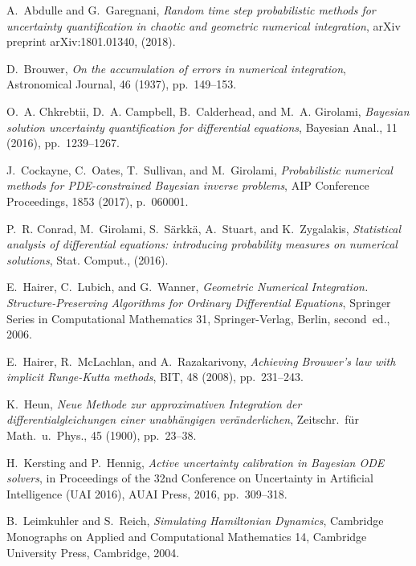 \documentclass{siamart1116}
\numberwithin{theorem}{section}
\begin{document}
\def\cprime{$'$}
\begin{thebibliography}{10}
	
	{\sc A.~Abdulle and G.~Garegnani}, {\em Random time step probabilistic methods
		for uncertainty quantification in chaotic and geometric numerical
		integration}, arXiv preprint arXiv:1801.01340,  (2018).
	
	{\sc D.~Brouwer}, {\em On the accumulation of errors in numerical integration},
	Astronomical Journal, 46 (1937), pp.~149--153.
	
	{\sc O.~A. Chkrebtii, D.~A. Campbell, B.~Calderhead, and M.~A. Girolami}, {\em
		Bayesian solution uncertainty quantification for differential equations},
	Bayesian Anal., 11 (2016), pp.~1239--1267.
	
	{\sc J.~Cockayne, C.~Oates, T.~Sullivan, and M.~Girolami}, {\em Probabilistic
		numerical methods for {PDE}-constrained {B}ayesian inverse problems}, AIP
	Conference Proceedings, 1853 (2017), p.~060001.
	
	{\sc P.~R. Conrad, M.~Girolami, S.~S{\"a}rkk{\"a}, A.~Stuart, and
		K.~Zygalakis}, {\em Statistical analysis of differential equations:
		introducing probability measures on numerical solutions}, Stat. Comput.,
	(2016).
	
	{\sc E.~Hairer, C.~Lubich, and G.~Wanner}, {\em Geometric Numerical
		Integration. Structure-Preserving Algorithms for Ordinary Differential
		Equations}, Springer Series in Computational Mathematics 31, Springer-Verlag,
	Berlin, second~ed., 2006.
	
	{\sc E.~Hairer, R.~McLachlan, and A.~Razakarivony}, {\em Achieving {B}rouwer's
		law with implicit {R}unge-{K}utta methods}, BIT, 48 (2008), pp.~231--243.
	
	{\sc K.~Heun}, {\em Neue {M}ethode zur approximativen {I}ntegration der
		dif\-feren\-tial\-gleichungen einer unabh\"angigen ver\"anderlichen},
	Zeitschr.\ f\"ur Math.\ u.\ Phys., 45 (1900), pp.~23--38.
	
	{\sc H.~Kersting and P.~Hennig}, {\em Active uncertainty calibration in
		{B}ayesian {ODE} solvers}, in Proceedings of the 32nd Conference on
	Uncertainty in Artificial Intelligence (UAI 2016), {AUAI} Press, 2016,
	pp.~309--318.
	
	{\sc B.~Leimkuhler and S.~Reich}, {\em Simulating {H}amiltonian {D}ynamics},
	Cambridge Monographs on Applied and Computational Mathematics 14, Cambridge
	University Press, Cambridge, 2004.
	

\end{thebibliography}
\end{document}
